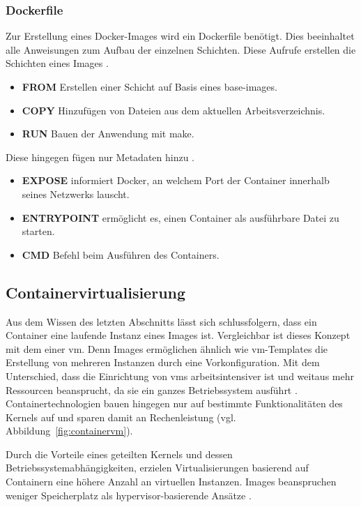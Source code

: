 \subsubsection{Dockerfile}
Zur Erstellung eines Docker-Images wird ein Dockerfile benötigt. Dies beeinhaltet alle Anweisungen
zum Aufbau der einzelnen Schichten. 
Diese Aufrufe erstellen die Schichten eines Images \cite{dockerbestpracticedockerfile}.
\begin{itemize}
    \item \textbf{FROM} Erstellen einer Schicht auf Basis eines base-images. 
    \item \textbf{COPY} Hinzufügen von Dateien aus dem aktuellen Arbeitsverzeichnis. 
    \item \textbf{RUN} Bauen der Anwendung mit make. 
\end{itemize}
Diese hingegen fügen nur Metadaten hinzu \cite{dockerbestpracticedockerfile}.
\begin{itemize}
    \item \textbf{EXPOSE} informiert Docker, an welchem Port der Container innerhalb seines Netzwerks lauscht.
    \item \textbf{ENTRYPOINT} ermöglicht es, einen Container als ausführbare Datei zu starten.
    \item \textbf{CMD} Befehl beim Ausführen des Containers.
\end{itemize}


\subsection{Containervirtualisierung}
Aus dem Wissen des letzten Abschnitts lässt sich schlussfolgern, dass
ein Container eine laufende Instanz eines Images ist.
Vergleichbar ist dieses Konzept mit dem einer \acs{vm}.
Denn Images ermöglichen ähnlich wie \acs{vm}-Templates die Erstellung von mehreren Instanzen durch eine Vorkonfiguration.
Mit dem Unterschied, dass die Einrichtung von \acs{vm}s arbeitsintensiver ist und weitaus mehr Ressourcen
beansprucht, da sie ein ganzes Betriebssystem ausführt \cite{hypervisorcontainer}. Containertechnologien bauen hingegen nur auf 
bestimmte Funktionalitäten des Kernels auf und sparen damit an Rechenleistung (vgl. Abbildung~\ref{fig:containervm}).

Durch die Vorteile eines geteilten Kernels und dessen Betriebssystemabhängigkeiten,
erzielen Virtualisierungen basierend auf Containern eine höhere Anzahl an 
virtuellen Instanzen. Images beanspruchen weniger Speicherplatz als hypervisor-basierende Ansätze \cite{hypervisorcontainer}.

